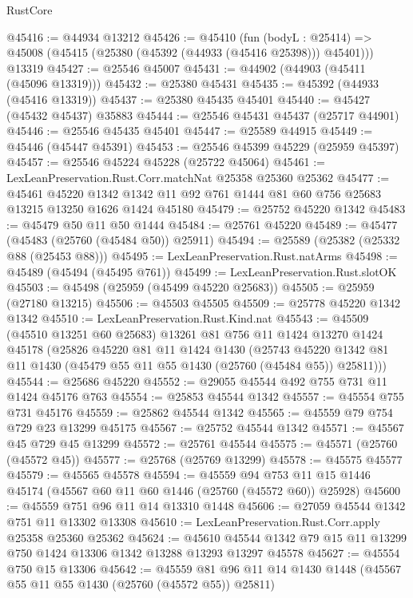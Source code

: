 \begin{lexlean}{RustCore}
\begin{coremodule}
@45416 := @44934 @13212
@45426 := @45410
    (fun (bodyL : @25414) => @45008 (@45415 (@25380 (@45392 (@44933 (@45416 @25398))) @45401)))
    @13319
@45427 := @25546 @45007
@45431 := @44902 (@44903 (@45411 (@45096 @13319)))
@45432 := @25380 @45431
@45435 := @45392 (@44933 (@45416 @13319))
@45437 := @25380 @45435 @45401
@45440 := @45427 (@45432 @45437) @35883
@45444 := @25546 @45431 @45437 (@25717 @44901)
@45446 := @25546 @45435 @45401
@45447 := @25589 @44915
@45449 := @45446 (@45447 @45391)
@45453 := @25546 @45399 @45229 (@25959 @45397)
@45457 := @25546 @45224 @45228 (@25722 @45064)
@45461 := LexLeanPreservation.Rust.Corr.matchNat @25358 @25360 @25362
@45477 := @45461
    @45220
    @1342
    @1342
    @11
    @92
    @761
    @1444
    @81
    @60
    @756
    @25683
    @13215
    @13250
    @1626
    @1424
    @45180
@45479 := @25752 @45220 @1342
@45483 := @45479 @50 @11 @50 @1444
@45484 := @25761 @45220
@45489 := @45477 (@45483 (@25760 (@45484 @50)) @25911)
@45494 := @25589 (@25382 (@25332 @88 (@25453 @88)))
@45495 := LexLeanPreservation.Rust.natArms
@45498 := @45489 (@45494 (@45495 @761))
@45499 := LexLeanPreservation.Rust.slotOK
@45503 := @45498 (@25959 (@45499 @45220 @25683))
@45505 := @25959 (@27180 @13215)
@45506 := @45503 @45505
@45509 := @25778 @45220 @1342 @1342
@45510 := LexLeanPreservation.Rust.Kind.nat
@45543 := @45509
    (@45510 @13251 @60 @25683)
    @13261
    @81
    @756
    @11
    @1424
    @13270
    @1424
    @45178
    (@25826
      @45220
      @81
      @11
      @1424
      @1430
      (@25743 @45220 @1342 @81 @11 @1430 (@45479 @55 @11 @55 @1430 (@25760 (@45484 @55)) @25811)))
@45544 := @25686 @45220
@45552 := @29055 @45544 @492 @755 @731 @11 @1424 @45176 @763
@45554 := @25853 @45544 @1342
@45557 := @45554 @755 @731 @45176
@45559 := @25862 @45544 @1342
@45565 := @45559 @79 @754 @729 @23 @13299 @45175
@45567 := @25752 @45544 @1342
@45571 := @45567 @45 @729 @45 @13299
@45572 := @25761 @45544
@45575 := @45571 (@25760 (@45572 @45))
@45577 := @25768 (@25769 @13299)
@45578 := @45575 @45577
@45579 := @45565 @45578
@45594 := @45559
    @94
    @753
    @11
    @15
    @1446
    @45174
    (@45567 @60 @11 @60 @1446 (@25760 (@45572 @60)) @25928)
@45600 := @45559 @751 @96 @11 @14 @13310 @1448
@45606 := @27059 @45544 @1342 @751 @11 @13302 @13308
@45610 := LexLeanPreservation.Rust.Corr.apply @25358 @25360 @25362
@45624 := @45610 @45544 @1342 @79 @15 @11 @13299 @750 @1424 @13306 @1342 @13288 @13293 @13297 @45578
@45627 := @45554 @750 @15 @13306
@45642 := @45559 @81 @96 @11 @14 @1430 @1448 (@45567 @55 @11 @55 @1430 (@25760 (@45572 @55)) @25811)

\end{coremodule}
\end{lexlean}
